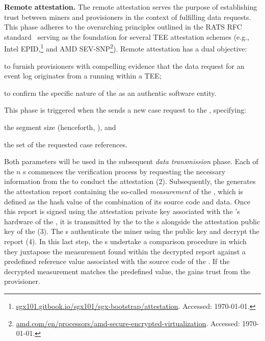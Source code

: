 \noindent\textbf{Remote attestation.} The remote attestation serves the purpose of establishing trust between miners and provisioners in the context of fulfilling data requests. This phase adheres to the overarching principles outlined in the RATS RFC standard~\cite{rfc9334} serving as the foundation for several TEE attestation schemes (e.g., Intel EPID,\footnote{\url{sgx101.gitbook.io/sgx101/sgx-bootstrap/attestation}. Accessed: \today.} and AMD SEV-SNP\footnote{\url{amd.com/en/processors/amd-secure-encrypted-virtualization}. Accessed: \today.}). Remote attestation has a dual objective:
\begin{inparaenum}
    \item to furnish provisioners with compelling evidence that the data request for an event log originates from a  running within a TEE;
    \item to confirm the specific nature of the  as an authentic  software entity.
\end{inparaenum}
This phase is triggered when the  sends a new case request to the , specifying:
\begin{inparaenum}
    \item the segment size (henceforth, \SegSize), and
    \item the set of the requested case references.
\end{inparaenum}
Both parameters will be used in the subsequent \textit{data transmission} phase. Each of the $n$ s commences the verification process by requesting the necessary information from the  to conduct the attestation (2). Subsequently, the  generates the attestation report containing the so-called \emph{measurement} of the , which is defined as the hash value of the combination of its source code and data. Once this report is signed using the attestation private key associated with the 's hardware of the , it is transmitted by the  to the s alongside the attestation public key of the  (3). The s authenticate the miner using the public key and decrypt the report (4). In this last step, the s undertake a comparison procedure in which they juxtapose the measurement found within the decrypted report against a predefined reference value associated with the source code of the . If the decrypted measurement matches the predefined value, the  gains trust from the provisioner.

